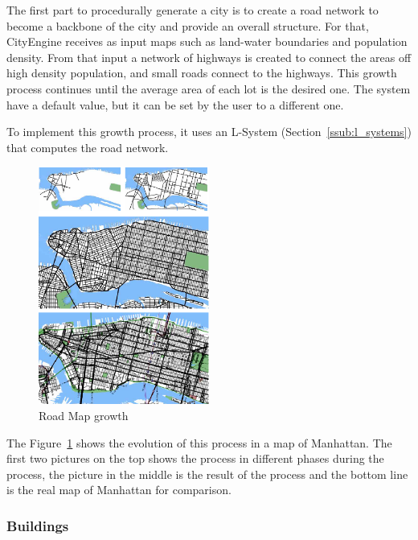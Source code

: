 The first part to procedurally generate a city is to create a road network to become a backbone of the city and provide an overall structure. For that, CityEngine receives as input maps such as land-water boundaries and population
density. From that input a network of highways is created to connect the areas off high density population, and small roads connect to the highways.
This growth process continues until the average area of each lot is the desired one. The system have a default value, but it can be set by the user to a different one.

To implement this growth process, it uses an L-System (Section~\ref{ssub:l_systems}) that computes the road network.


\begin{figure}[htbp]
  \centering
  \includegraphics[width=0.5\textwidth]{img/Procedural-Modeling-of-Cities/Capturar.png}
  \caption{Road Map growth}
  \label{fig:city}
\end{figure}

The Figure~\ref{fig:city} shows the evolution of this process in a map of Manhattan. The first two pictures on the top shows the process in different phases during the process, the picture in the middle is the result of the process and the bottom line is the real map of Manhattan for comparison.


\subsubsection{Buildings} %
\label{ssub:buildings1}

